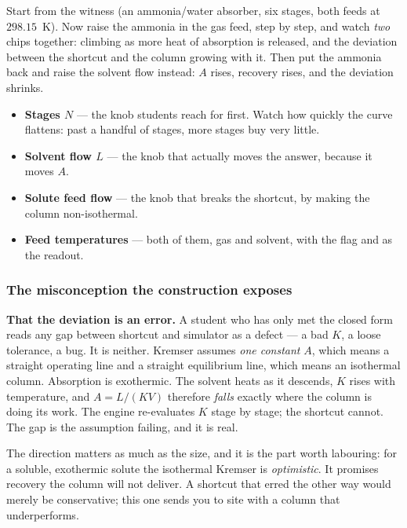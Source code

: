 \documentclass[11pt,a4paper]{article}
\begin{document}
\begin{tryit}
Start from the witness (an ammonia/water absorber, six stages, both feeds
at $298.15$~K).  Now raise the ammonia in the gas feed, step by step, and
watch \emph{two} chips together:  climbing as more heat of
absorption is released, and the deviation between the shortcut and the
column growing with it.  Then put the ammonia back and raise the solvent
flow instead: $A$ rises, recovery rises, and the deviation shrinks.
\end{tryit}

\begin{itemize}[leftmargin=*,nosep]
  \item \textbf{Stages $N$} --- the knob students reach for first.  Watch
        how quickly the curve flattens: past a handful of stages, more
        stages buy very little.
  \item \textbf{Solvent flow $L$} --- the knob that actually moves the
        answer, because it moves $A$.
  \item \textbf{Solute feed flow} --- the knob that breaks the shortcut,
        by making the column non-isothermal.
  \item \textbf{Feed temperatures} --- both of them, gas and solvent, with
        the  flag and  as the readout.
\end{itemize}

\subsubsection*{The misconception the construction exposes}

\begin{pitfall}
\textbf{That the deviation is an error.}  A student who has only met the
closed form reads any gap between shortcut and simulator as a defect ---
a bad $K$, a loose tolerance, a bug.  It is neither.  Kremser assumes
\emph{one constant} $A$, which means a straight operating line and a
straight equilibrium line, which means an isothermal column.  Absorption
is exothermic.  The solvent heats as it descends, $K$ rises with
temperature, and $A = L/(KV)$ therefore \emph{falls} exactly where the
column is doing its work.  The engine re-evaluates $K$ stage by stage; the
shortcut cannot.  The gap is the assumption failing, and it is real.
\end{pitfall}

The direction matters as much as the size, and it is the part worth
labouring: for a soluble, exothermic solute the isothermal Kremser is
\emph{optimistic}.  It promises recovery the column will not deliver.  A
shortcut that erred the other way would merely be conservative; this one
sends you to site with a column that underperforms.
\end{document}
